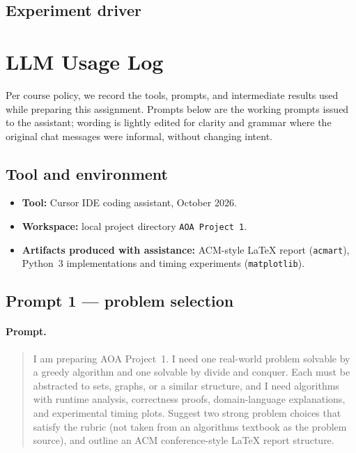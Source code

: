 \documentclass[sigconf,review=false]{acmart}
\theoremstyle{definition}
\begin{document}
\subsection{Experiment driver}


\section{LLM Usage Log}
\label{app:llm}

Per course policy, we record the tools, prompts, and intermediate results
used while preparing this assignment. Prompts below are the working prompts
issued to the assistant; wording is lightly edited for clarity and grammar
where the original chat messages were informal, without changing intent.

\subsection{Tool and environment}
\begin{itemize}
  \item \textbf{Tool:} Cursor IDE coding assistant, October 2026.
  \item \textbf{Workspace:} local project directory \texttt{AOA Project 1}.
  \item \textbf{Artifacts produced with assistance:} ACM-style \LaTeX{}
        report (\texttt{acmart}), Python~3 implementations and timing
        experiments (\texttt{matplotlib}).
\end{itemize}

\subsection{Prompt 1 --- problem selection}
\paragraph{Prompt.}
\begin{quote}
I am preparing AOA Project~1. I need one real-world problem solvable by a
greedy algorithm and one solvable by divide and conquer. Each must be
abstracted to sets, graphs, or a similar structure, and I need algorithms
with runtime analysis, correctness proofs, domain-language explanations,
and experimental timing plots. Suggest two strong problem choices that
satisfy the rubric (not taken from an algorithms textbook as the problem
source), and outline an ACM conference-style \LaTeX{} report structure.
\end{quote}
\end{document}
